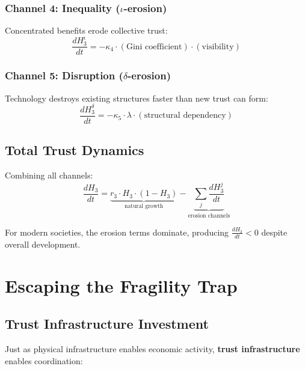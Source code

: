 \documentclass[11pt,a4paper]{article}
\begin{document}
\subsubsection{Channel 4: Inequality ($\iota$-erosion)}
Concentrated benefits erode collective trust:
\begin{equation}
\frac{dH_3^{\iota}}{dt} = -\kappa_4 \cdot (\text{Gini coefficient}) \cdot (\text{visibility})
\end{equation}

\subsubsection{Channel 5: Disruption ($\delta$-erosion)}
Technology destroys existing structures faster than new trust can form:
\begin{equation}
\frac{dH_3^{\delta}}{dt} = -\kappa_5 \cdot \lambda \cdot (\text{structural dependency})
\end{equation}

\subsection{Total Trust Dynamics}

Combining all channels:
\begin{equation}
\frac{dH_3}{dt} = \underbrace{r_3 \cdot H_3 \cdot (1 - H_3)}_{\text{natural growth}} - \underbrace{\sum_{j} \frac{dH_3^{j}}{dt}}_{\text{erosion channels}}
\end{equation}

For modern societies, the erosion terms dominate, producing $\frac{dH_3}{dt} < 0$ despite overall development.

\section{Escaping the Fragility Trap}

\subsection{Trust Infrastructure Investment}

Just as physical infrastructure enables economic activity, \textbf{trust infrastructure} enables coordination:
\end{document}
